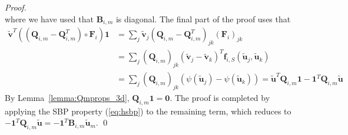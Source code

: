 \documentclass{svjour3}                     %
\renewcommand{\tilde}{\widetilde}
\newcommand{\LRp}[1]{\left( #1 \right)}
\begin{document}
\begin{proof}
\[\]
where we have used that $\bm{B}_{i,m}$ is diagonal.  The final part of the proof uses that 
\begin{align*}
\tilde{\bm{v}}^T\LRp{\LRp{\bm{Q}_{i,m}-\bm{Q}_{i,m}^T} \circ \bm{F}_i}\bm{1} &= \sum_j {\tilde{\bm{v}}}_j \LRp{\bm{Q}_{i,m}-\bm{Q}_{i,m}^T}_{jk} \LRp{\bm{F}_{i}}_{jk}\\
&= \sum_j \LRp{\bm{Q}_{i,m}}_{jk} \LRp{{\tilde{\bm{v}}}_j-{\tilde{\bm{v}}}_k}^T\bm{f}_{i,S}\LRp{\tilde{\bm{u}}_j,\tilde{\bm{u}}_k}\\
&= \sum_j \LRp{\bm{Q}_{i,m}}_{jk} \LRp{\psi(\tilde{\bm{u}}_j)-\psi(\tilde{\bm{u}}_k)} = \tilde{\bm{u}}^T\bm{Q}_{i,m}\bm{1} - \bm{1}^T\bm{Q}_{i,m}\tilde{\bm{u}}
\end{align*}
By Lemma~\ref{lemma:Qmprops_3d}, $\bm{Q}_{i,m}\bm{1} = \bm{0}$.  The proof is completed by applying the SBP property (\ref{eq:hsbp}) to the remaining term, which reduces to $- \bm{1}^T\bm{Q}_{i,m}\tilde{\bm{u}}=-\bm{1}^T\bm{B}_{i,m}\tilde{\bm{u}}_m$.
\qed\end{proof}
\end{document}
